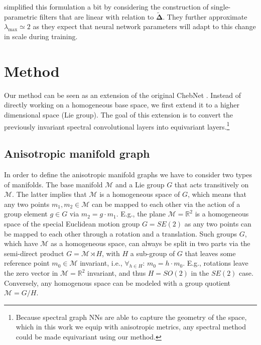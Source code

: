 \documentclass{article}
\begin{document}
\citet{kipf2016gcn} simplified this formulation a bit by considering the construction of single-parametric filters that are linear with relation to $\boldsymbol{\tilde{\Delta}}$. They further approximate $\lambda_{\max} \simeq 2$ as they expect that neural network parameters will adapt to this change in scale during training.

\section{Method} \label{sec:method}

Our method can be seen as an extension of the original ChebNet \citep{defferrard2016chebnet, perraudin2019deepsphere}. Instead of directly working on a homogeneous base space, we first extend it to a higher dimensional space (Lie group). The goal of this extension is to convert the previously invariant spectral convolutional layers into equivariant layers.\footnote{Because spectral graph NNs are able to capture the geometry of the space, which in this work we equip with anisotropic metrics, any spectral method could be made equivariant using our method.}

\subsection{Anisotropic manifold graph} \label{sec:anisotropic_manifold_graph}

In order to define the anisotropic manifold graphs we have to consider two types of manifolds. The base manifold $\mathcal{M}$ and a Lie group $G$ that acts transitively on $\mathcal{M}$. The latter implies that $\mathcal{M}$ is a homogeneous space of $G$, which means that any two points $m_1, m_2 \in \mathcal{M}$ can be mapped to each other via the action of a group element $g \in G$ via $m_2 = g \cdot m_1$. E.g., the plane $\mathcal{M}=\mathbb{R}^2$ is a homogeneous space of the special Euclidean motion group $G=SE(2)$ as any two points can be mapped to each other through a rotation and a translation. Such groups $G$, which have $\mathcal{M}$ as a homogeneous space, can always be split in two parts via the semi-direct product $G = \mathcal{M} \rtimes H$, with $H$ a sub-group of $G$ that leaves some reference point $m_0 \in \mathcal{M}$ invariant, i.e., $\forall_{h \in H}: \,m_0 = h \cdot m_0$. E.g., rotations leave the zero vector in $\mathcal{M}=\mathbb{R}^2$ invariant, and thus $H=SO(2)$ in the $SE(2)$ case. Conversely, any homogenous space can be modeled with a group quotient $\mathcal{M} = G / H$.
\end{document}
